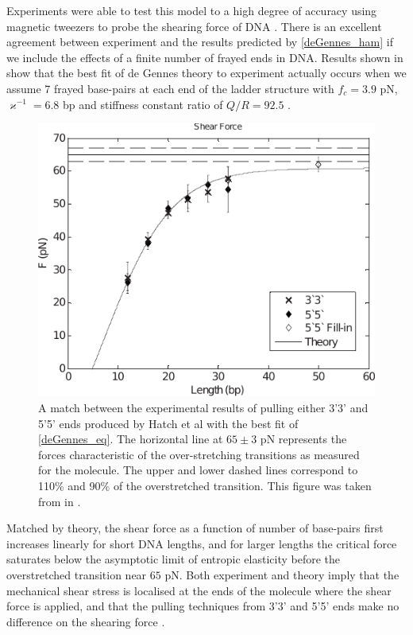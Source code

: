 %
Experiments were able to test this model to a high degree of accuracy using magnetic tweezers to probe the shearing force of DNA \cite{Hatch2008}. There is an excellent agreement between experiment and the results predicted by \eqref{deGennes_ham} if we include the effects of a finite number of frayed ends in DNA. Results shown in  show that the best fit of de Gennes theory to experiment actually occurs when we assume 7 frayed base-pairs at each end of the ladder structure with $f_{c}=3.9$ pN, $\varkappa^{-1} = 6.8$ bp and stiffness constant ratio of $Q/R = 92.5$ \cite{Hatch2008}. 
%
\begin{figure}[h]
\centering
\includegraphics[scale=1]{Graphics/DNA/fig1_Hatch2008.pdf}
\caption{A match between the experimental results of pulling either 3'3' and 5'5' ends produced by Hatch et al with the best fit of \eqref{deGennes_eq}. The horizontal line at $65\pm3$ pN represents the forces characteristic of the over-stretching transitions as measured for the molecule. The upper and lower dashed lines correspond to 110\% and 90\% of the overstretched transition. This figure was taken from in \cite{Hatch2008}.}
\label{fig:fig1_Hatch2008}
\end{figure}
%
Matched by theory, the shear force as a function of number of base-pairs first increases linearly for short DNA lengths, and for larger lengths the critical force saturates below the asymptotic limit of entropic elasticity before the overstretched transition near $65$ pN. Both experiment and theory imply that the mechanical shear stress is localised at the ends of the molecule where the shear force is applied, and that the pulling techniques from 3'3' and 5'5' ends make no difference on the shearing force \cite{Hatch2008}. 

